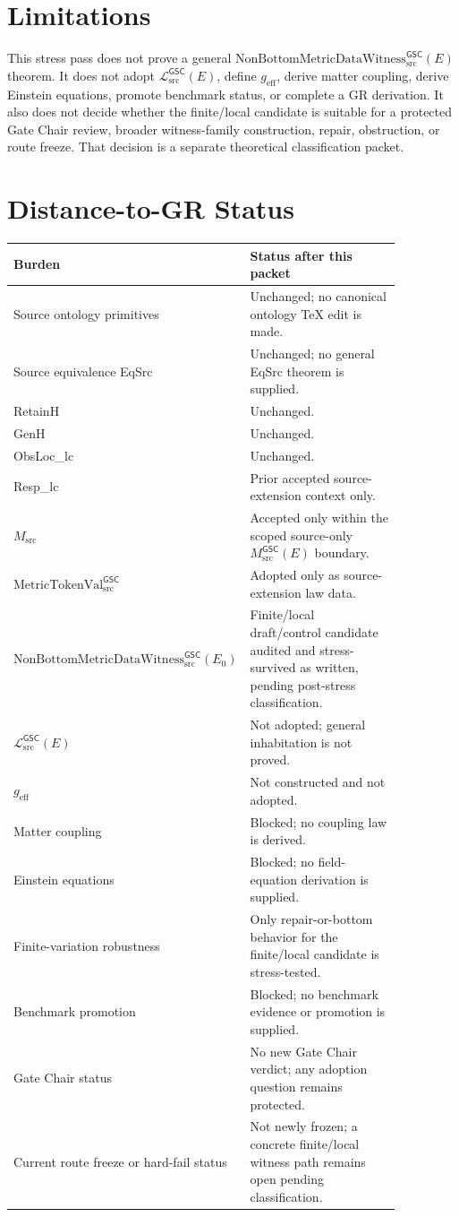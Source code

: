 \documentclass[11pt]{article}
\newcommand{\MetricTokenVal}{\mathrm{MetricTokenVal}_{\mathrm{src}}^{\mathsf{GSC}}}
\newcommand{\Witness}{\mathrm{NonBottomMetricDataWitness}_{\mathrm{src}}^{\mathsf{GSC}}}
\newcommand{\MetricData}{\mathcal{L}_{\mathrm{src}}^{\mathsf{GSC}}}
\newcommand{\geff}{g_{\mathrm{eff}}}
\newcommand{\Ezero}{E_{0}}
\begin{document}
\section{Limitations}

This stress pass does not prove a general \(\Witness(E)\) theorem. It does
not adopt \(\MetricData(E)\), define \(\geff\), derive matter coupling, derive
Einstein equations, promote benchmark status, or complete a GR derivation. It
also does not decide whether the finite/local candidate is suitable for a
protected Gate Chair review, broader witness-family construction, repair,
obstruction, or route freeze. That decision is a separate theoretical
classification packet.

\section{Distance-to-GR Status}

\begin{longtable}{p{0.30\linewidth}p{0.56\linewidth}}
\toprule
Burden & Status after this packet \\
\midrule
Source ontology primitives & Unchanged; no canonical ontology TeX edit is made. \\
Source equivalence EqSrc & Unchanged; no general EqSrc theorem is supplied. \\
RetainH & Unchanged. \\
GenH & Unchanged. \\
ObsLoc\_lc & Unchanged. \\
Resp\_lc & Prior accepted source-extension context only. \\
\(M_{\mathrm{src}}\) & Accepted only within the scoped source-only \(M_{\mathrm{src}}^{\mathsf{GSC}}(E)\) boundary. \\
\(\MetricTokenVal\) & Adopted only as source-extension law data. \\
\(\Witness(\Ezero)\) & Finite/local draft/control candidate audited and stress-survived as written, pending post-stress classification. \\
\(\MetricData(E)\) & Not adopted; general inhabitation is not proved. \\
\(\geff\) & Not constructed and not adopted. \\
Matter coupling & Blocked; no coupling law is derived. \\
Einstein equations & Blocked; no field-equation derivation is supplied. \\
Finite-variation robustness & Only repair-or-bottom behavior for the finite/local candidate is stress-tested. \\
Benchmark promotion & Blocked; no benchmark evidence or promotion is supplied. \\
Gate Chair status & No new Gate Chair verdict; any adoption question remains protected. \\
Current route freeze or hard-fail status & Not newly frozen; a concrete finite/local witness path remains open pending classification. \\
\bottomrule
\end{longtable}
\end{document}
